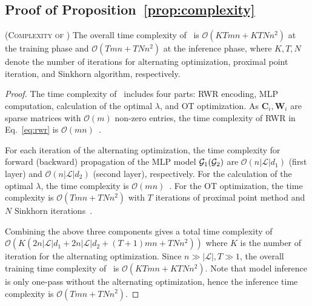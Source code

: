 \subsection{Proof of Proposition~\ref{prop:complexity}}
\begin{proposition*}
{\normalfont (\textsc{Complexity of \algname})} The overall time complexity of \algname\ is $\mathcal{O}\left(KTmn+KTNn^2\right)$ at the training phase and $\mathcal{O}\left(Tmn+TNn^2\right)$ at the inference phase, where $K, T, N$ denote the number of iterations for alternating optimization, proximal point iteration, and Sinkhorn algorithm, respectively.
\end{proposition*}
\begin{proof}
    The time complexity of \algname\ includes four parts: RWR encoding, MLP computation, calculation of the optimal $\lambda$, and OT optimization. As $\mathbf{C}_i,\mathbf{W}_i$ are sparse matrices with $\mathcal{O}(m)$ non-zero entries, the time complexity of RWR in Eq.~\eqref{eq:rwr} is $\mathcal{O}(mn)$~\cite{parrot}.
    
    For each iteration of the alternating optimization, the time complexity for forward (backward) propagation of the MLP model $\mathcal{G}_1(\mathcal{G}_2)$ are $\mathcal{O}(n|\mathcal{L}|d_1)$ (first layer) and $\mathcal{O}(n|\mathcal{L}|d_2)$ (second layer), respectively. For the calculation of the optimal $\lambda$, the time complexity is $\mathcal{O}(mn)$~\cite{parrot}. For the OT optimization, the time complexity is $\mathcal{O}(Tmn+TNn^2)$ with $T$ iterations of proximal point method and $N$ Sinkhorn iterations~\cite{parrot}.
    
    Combining the above three components gives a total time complexity of $\mathcal{O}\left(K(2n|\mathcal{L}|d_1+2n|\mathcal{L}|d_2+(T+1)mn+TNn^2)\right)$ where $K$ is the number of iteration for the alternating optimization. Since $n\gg |\mathcal{L}|,T\gg1$, the overall training time complexity of \algname\ is $\mathcal{O}(KTmn+KTNn^2)$. Note that model inference is only one-pass without the alternating optimization, hence the inference time complexity is $\mathcal{O}\left(Tmn+TNn^2\right)$.
\end{proof}

\vspace{-5pt}
